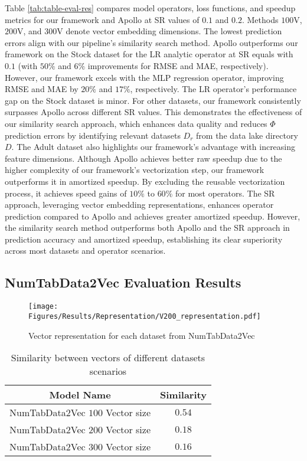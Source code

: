 Table \ref{tab:table-eval-res} compares model operators, loss functions, and speedup metrics for our framework and Apollo at SR values of $0.1$ and $0.2$. Methods $100$V, $200$V, and $300$V denote vector embedding dimensions. The lowest prediction errors align with our pipeline's similarity search method.
Apollo outperforms our framework on the Stock dataset for the LR analytic operator at SR equals with $0.1$ (with $50\%$ and $6\%$ improvements for RMSE and MAE, respectively). However, our framework excels with the MLP regression operator, improving RMSE and MAE by $20\%$ and $17\%$, respectively. The LR operator's performance gap on the Stock dataset is minor.
For other datasets, our framework consistently surpasses Apollo across different SR values. This demonstrates the effectiveness of our similarity search approach, which enhances data quality and reduces $\Phi$ prediction errors by identifying relevant datasets $D_r$ from the data lake directory $D$. The Adult dataset also highlights our framework's advantage with increasing feature dimensions.
Although Apollo achieves better raw speedup due to the higher complexity of our framework's vectorization step, our framework outperforms it in amortized speedup. By excluding the reusable vectorization process, it achieves speed gains of $10\%$ to $60\%$ for most operators.
The SR approach, leveraging vector embedding representations, enhances operator prediction compared to Apollo and achieves greater amortized speedup. However, the similarity search method outperforms both Apollo and the SR approach in prediction accuracy and amortized speedup, establishing its clear superiority across most datasets and operator scenarios.

\subsection{NumTabData2Vec Evaluation Results}

\begin{figure}[!ht]
    \centering
    \texttt{[image: Figures/Results/Representation/V200\_representation.pdf]}
    \caption{Vector representation for each dataset from NumTabData2Vec}
    \label{fig:eval-data-repr}
\end{figure}


\begin{table}[!htp]
    \centering
    \caption{Similarity between vectors of different datasets scenarios}
    \label{tab:vec-rep-sim}
    \setlength\doublerulesep{0.5pt}
    \begin{tabular}{||c|c||}
    \hline
    Model Name & Similarity \\
    \hline\hline
     \makecell{NumTabData2Vec\\$100$ Vector size} & $0.54$\\
     \hline
      \makecell{NumTabData2Vec\\$200$ Vector size}   & $0.18$\\
      \hline
       \makecell{NumTabData2Vec\\$300$ Vector size}  & $0.16$\\ \hline
    \end{tabular}
\end{table}

